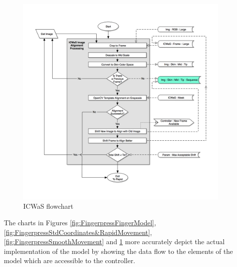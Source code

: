 \begin{figure}[h!]
  \centering
    \includegraphics[width=0.95\textwidth]{Chapter4/Figs/Fingerpress_ICWaS.jpg}
    \caption{ICWaS flowchart}\label{fig:FingerpressICWaS}
\end{figure}

The charts in Figures \ref{fig:FingerpressFingerModel}, \ref{fig:FingerpressStdCoordinates&RapidMovement}, \ref{fig:FingerpressSmoothMovement} and \ref{fig:FingerpressICWaS} more accurately depict the actual implementation of the model by showing the data flow to the elements of the model which are accessible to the controller. 
\clearpage

